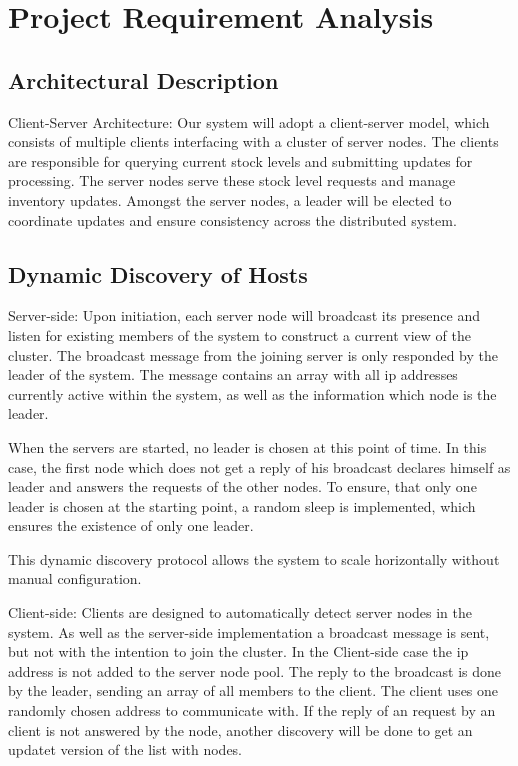 \chapter{Project Requirement Analysis} \label{ch:ProjectRequirementAnalysis}
\section{Architectural Description} \label{sec:ArchitecturalDescription}
Client-Server Architecture: Our system will adopt a client-server model, which consists of multiple clients interfacing with a cluster of server nodes. The clients are responsible for querying current stock levels and submitting updates for processing. The server nodes serve these stock level requests and manage inventory updates. Amongst the server nodes, a leader will be elected to coordinate updates and ensure consistency across the distributed system.


\section{Dynamic Discovery of Hosts} \label{sec:DynamicDiscoveryOfHosts}
Server-side: Upon initiation, each server node will broadcast its presence and listen for existing members of the system to construct a current view of the cluster. The broadcast message from the joining server is only responded by the
leader of the system. The message contains an array with all ip addresses currently active within the system, as well as the information which node is the leader.

When the servers are started, no leader is chosen at this point of time. In this case, the first node which does not get a reply of his broadcast declares himself as leader and answers the requests of the other nodes.
To ensure, that only one leader is chosen at the starting point, a random sleep is implemented, which ensures the existence of only one leader.

This dynamic discovery protocol allows the system to scale horizontally without manual configuration.

Client-side: Clients are designed to automatically detect server nodes in the system. As well as the server-side implementation a broadcast message is sent, but not with the intention
to join the cluster. In the Client-side case the ip address is not added to the server node pool. The reply to the broadcast is done by the leader, sending an array of all members to the client. 
The client uses one randomly chosen address to communicate with. If the reply of an request by an client is not answered by the node, another discovery will be done to get an updatet version of the list with nodes.

